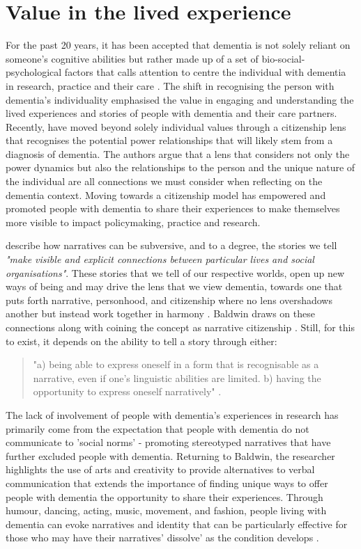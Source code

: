 \section{Value in the lived experience}
\label{Method:experience}
For the past 20 years, it has been accepted that dementia is not solely reliant on someone's cognitive abilities but rather made up of a set of bio-social-psychological factors that calls attention to centre the individual with dementia in research, practice and their care \citep{dewing_personhood_2008}. The shift in recognising the person with dementia's individuality emphasised the value in engaging and understanding the lived experiences and stories of people with dementia and their care partners. Recently, \cite{bartlett_personhood_2007} have moved beyond solely individual values through a citizenship lens that recognises the potential power relationships that will likely stem from a diagnosis of dementia. The authors argue that a lens that considers not only the power dynamics but also the relationships to the person and the unique nature of the individual are all connections we must consider when reflecting on the dementia context. Moving towards a citizenship model has empowered and promoted people with dementia to share their experiences to make themselves more visible to impact policymaking, practice and research. 

\cite{ewick_subversive_1995} describe how narratives can be subversive, and to a degree, the stories we tell \textit{"make visible and explicit connections between particular lives and social organisations"}. These stories that we tell of our respective worlds, open up new ways of being and may drive the lens that we view dementia, towards one that puts forth narrative, personhood, and citizenship where no lens overshadows another but instead work together in harmony \citep{dupuis_re-claiming_2016}. Baldwin draws on these connections along with coining the concept as narrative citizenship \citep{baldwin_narrative_2008}. Still, for this to exist, it depends on the ability to tell a story through either:
\begin{quote}
 "a) being able to express oneself in a form that is recognisable as a narrative, even if one's linguistic abilities are limited. 
b) having the opportunity to express oneself narratively" \citep{baldwin_narrative_2008}.  
\end{quote}


The lack of involvement of people with dementia's experiences in research has primarily come from the expectation that people with dementia do not communicate to 'social norms' - promoting stereotyped narratives that have further excluded people with dementia. Returning to Baldwin, the researcher highlights the use of arts and creativity to provide alternatives to verbal communication that extends the importance of finding unique ways to offer people with dementia the opportunity to share their experiences. Through humour, dancing, acting, music, movement, and fashion, people living with dementia can evoke narratives and identity that can be particularly effective for those who may have their narratives' dissolve' as the condition develops \cite{john_killick_claire_craig_creativity_2012}. 

